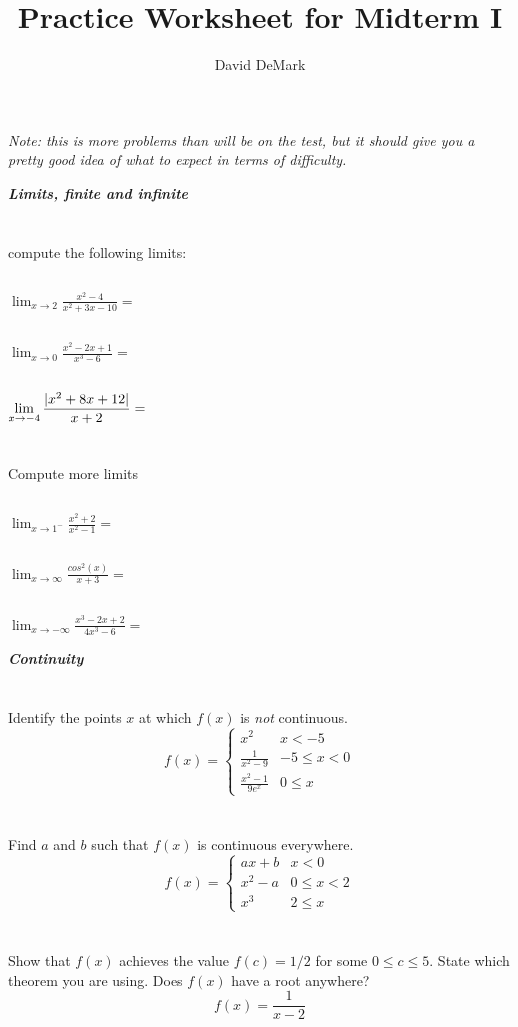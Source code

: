 \documentclass[english]{article}
\title{Practice Worksheet for Midterm I}
\author{David DeMark}
\date{\due}
\DeclarePairedDelimiter\abs{\lvert}{\rvert}%
\newcommand{\prob}[1]{\setcounter{section}{#1-1}\section{}}
\newcommand{\prt}[1]{\setcounter{subsection}{#1-1}\subsection{}}
\theoremstyle{remark}
\theoremstyle{definition}
\begin{document}
	\maketitle
	\emph{Note: this is more problems than will be on the test, but it should give you a pretty good idea of what to expect in terms of difficulty.}
\begin{center}{\LARGE\textbf{\emph{Limits, finite and infinite}}}\end{center}
	\prob{1} compute the following limits:
	\prt{1} $\displaystyle{\lim_{x\to 2} \frac{x^2-4}{x^2+3x-10}=}$\vspace{4cm}
	\prt{2} $\displaystyle{\lim_{x\to 0} \frac{x^2-2x+1}{x^3-6}=}$\vspace{4cm}
	\prt{3} $\displaystyle{\lim_{x\to -4} \frac{\abs{x^2+8x+12}}{x+2}=}$\vspace{4cm}\newpage
	\prob{2} Compute more limits
	\prt{1} $\displaystyle{\lim_{x\to 1^-} \frac{x^2+2}{x^2-1}=}$\vspace{5cm}
	\prt{2}	$\displaystyle{\lim_{x\to \infty} \frac{cos^2(x)}{x+3}=}$\vspace{5cm}
	\prt{3} $\displaystyle{\lim_{x\to -\infty} \frac{x^3-2x+2}{4x^3-6}=}$\vspace{5cm}\newpage
	\begin{center}{\LARGE\textbf{\emph{Continuity}}}\end{center}
	\prob{3} Identify the points $x$ at which $f(x)$ is \emph{not} continuous.
	\begin{equation*} f(x)=\begin{cases}
x^2&x<-5\\
\frac{1}{x^2-9}&-5\leq x<0\\
\frac{x^2-1}{9e^x}& 0\leq x 
	\end{cases}
	\end{equation*}
	\vspace{4cm}
	\prob{4} Find $a$ and $b$ such that $f(x)$ is continuous everywhere.
	\begin{equation*}
	f(x)=\begin{cases}
	ax+b&x<0\\
	x^2-a &0\leq x <2\\
	x^3 & 2\leq x
	\end{cases}
	\end{equation*}\vspace{4.5cm}
	\prob{5} Show that $f(x)$ achieves the value $f(c)=1/2$ for some $0\leq c \leq 5$. State which theorem you are using. Does $f(x)$ have a root anywhere?
	$$f(x)=\frac{1}{x-2}$$\vspace{6cm}
\end{document}
